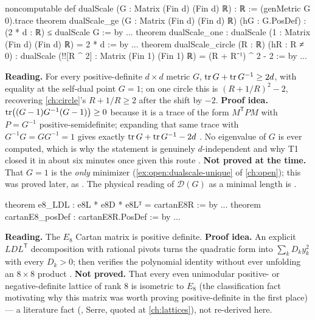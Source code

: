 \begin{leanbox}
\begin{leancode}
noncomputable def dualScale (G : Matrix (Fin d) (Fin d) ℝ) : ℝ :=
  (genMetric G 0).trace
theorem dualScale_ge (G : Matrix (Fin d) (Fin d) ℝ) (hG : G.PosDef) :
    (2 * d : ℝ) ≤ dualScale G := by ...
theorem dualScale_one : dualScale (1 : Matrix (Fin d) (Fin d) ℝ) = 2 * d := by ...
theorem dualScale_circle (R : ℝ) (hR : R ≠ 0) :
    dualScale (!![R ^ 2] : Matrix (Fin 1) (Fin 1) ℝ) = (R + R⁻¹) ^ 2 - 2 := by ...
\end{leancode}
\textbf{Reading.} For every positive-definite $d\times d$ metric $G$, $\operatorname{tr} G+\operatorname{tr} G^{-1}\ge
2d$, with equality at the self-dual point $G=1$; on one circle this is $(R+1/R)^2-2$,
recovering \cref{ch:circle}'s $R+1/R\ge2$ after the shift by $-2$. \textbf{Proof idea.}
$\operatorname{tr}\bigl((G-1)G^{-1}(G-1)\bigr)\ge0$ because it is a trace of the form $M^{\mathsf T}PM$
with $P=G^{-1}$ positive-semidefinite; expanding that same trace with $G^{-1}G=GG^{-1}=1$
gives exactly $\operatorname{tr} G+\operatorname{tr} G^{-1}-2d$ . No eigenvalue
of $G$ is ever computed, which is why the statement is genuinely $d$-independent and why
T1 closed it in about six minutes once given this route . \textbf{Not proved at the time.} That $G=1$ is the \emph{only} minimizer
(\cref{ex:open:dualscale-unique} of \cref{ch:open}); this was proved later, as
. The physical
reading of $\mathcal D(G)$ as a minimal length is \TC. \TA
\end{leanbox}

\begin{leanbox}
\begin{leancode}
theorem e8_LDL : e8L * e8D * e8Lᵀ = cartanE8R := by ...
theorem cartanE8_posDef : cartanE8R.PosDef := by ...
\end{leancode}
\textbf{Reading.} The $E_8$ Cartan matrix is positive definite. \textbf{Proof idea.} An
explicit $LDL^{\mathsf T}$ decomposition with rational pivots turns the quadratic form into
$\sum_k D_k y_k^2$ with every $D_k>0$;  then verifies the polynomial identity
without ever unfolding an $8\times8$ product .
\textbf{Not proved.} That every even unimodular positive- or negative-definite lattice of
rank 8 is isometric to $E_8$ (the classification fact motivating why this matrix was worth
proving positive-definite in the first place) — a literature fact (\TL, Serre, quoted at
\cref{ch:lattices}), not re-derived here. \TA
\end{leanbox}

